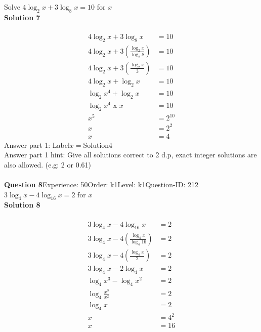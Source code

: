 \documentclass{article}
\begin{document}
Solve $4\log_{2}x+3\log_{8}x=10$ for $x$\\[4pt]
\noindent\textbf{Solution 7}\\[2pt]
\\[-35pt]\begin{align*}
4\log_{2}x+3\log_{8}x&=10\\[2pt]
4\log_{2}x+3\left(\displaystyle\frac{\log_{2}x}{\log_{2}8}\right)&=10\\[2pt]
4\log_{2}x+3\left(\displaystyle\frac{\log_{2}x}{3}\right)&=10\\[2pt]
4\log_{2}x+\log_{2}x&=10\\[2pt]
\log_{2}x^4+\log_{2}x&=10\\[2pt]
\log_{2}x^4\,\,\text{x}\,\,x&=10\\[2pt]
x^5&=2^{10}\\[2pt]
x&=2^2\\[2pt]
x&=4
\end{align*}
Answer part 1: \hspace{10pt}Label\hspace{10pt}$x=$\hspace{10pt}Solution\hspace{10pt}4\\
Answer part 1 hint: \hspace{15pt}Give all solutions correct to 2 d.p, exact integer solutions are also allowed. (e.g: 2 or 0.61)\\
\\[4pt]
\noindent\textbf{Question 8}\hspace{20pt}Experience: 50\hspace{20pt}Order: k1\hspace{20pt}Level: k1\hspace{20pt}Question-ID: 212\\[2pt]
$3\log_{4}x-4\log_{16}x=2$ for $x$\\[4pt]
\noindent\textbf{Solution 8}\\[2pt]
\\[-35pt]\begin{align*}
3\log_{4}x-4\log_{16}x&=2\\[2pt]
3\log_{4}x-4\left(\displaystyle\frac{\log_{4}x}{\log_{4}16}\right)&=2\\[2pt]
3\log_{4}x-4\left(\displaystyle\frac{\log_{4}x}{2}\right)&=2\\[2pt]
3\log_{4}x-2\log_{4}x&=2\\[2pt]
\log_{4}x^3-\log_{4}x^2&=2\\[2pt]
\log_{4}\displaystyle\frac{x^3}{x^2}&=2\\[2pt]
\log_{4} x&=2\\[2pt]
x&=4^2\\[2pt]
x&=16
\end{align*}
\end{document}
